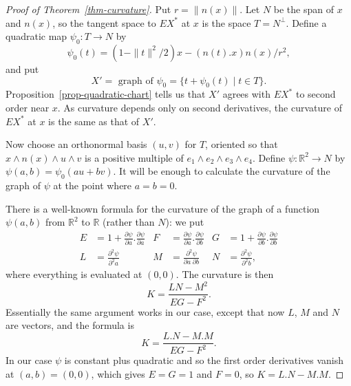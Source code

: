 \documentclass[reqno]{amsart}
\newcommand{\R}         {{\mathbb{R}}}
\newcommand{\st}        {\;|\;}
\renewcommand{\:}{\colon}
\theoremstyle{definition}
\begin{document}
\begin{proof}[Proof of Theorem~\ref{thm-curvature}]
 Put $r=\|n(x)\|$.  Let $N$ be the span of $x$ and $n(x)$, so the
 tangent space to $EX^*$ at $x$ is the space $T=N^\perp$.  Define a
 quadratic map $\psi_0\:T\to N$ by
 \[ \psi_0(t) = (1 - \|t\|^2/2)x - (n(t).x)n(x)/r^2, \]
 and put
 \[ X' = \text{ graph of } \psi_0 = \{t+\psi_0(t)\st t\in T\}. \]
 Proposition~\ref{prop-quadratic-chart} tells us that $X'$ agrees with
 $EX^*$ to second order near $x$.  As curvature depends only on second
 derivatives, the curvature of $EX^*$ at $x$ is the same as that of
 $X'$.

 Now choose an orthonormal basis $(u,v)$ for $T$, oriented so that
 $x\wedge n(x)\wedge u\wedge v$ is a positive multiple of
 $e_1\wedge e_2\wedge e_3\wedge e_4$.  Define $\psi\:\R^2\to N$ by
 $\psi(a,b)=\psi_0(au+bv)$.  It will be enough to calculate the
 curvature of the graph of $\psi$ at the point where $a=b=0$.

 There is a well-known formula for the curvature of the graph of a
 function $\psi(a,b)$ from $\R^2$ to $\R$ (rather than $N$): we put
 \begin{align*}
  E &= 1 + \frac{\partial \psi}{\partial a} . \frac{\partial \psi}{\partial a} &
  F &= \frac{\partial \psi}{\partial a} . \frac{\partial \psi}{\partial b} &
  G &= 1 + \frac{\partial \psi}{\partial b} . \frac{\partial \psi}{\partial b} \\
  L &= \frac{\partial^2\psi}{\partial^2 a} &
  M &= \frac{\partial^2\psi}{\partial a\;\partial b} &
  N &= \frac{\partial^2\psi}{\partial^2 b},
 \end{align*}
 where everything is evaluated at $(0,0)$.  The curvature is then
 \[ K = \frac{LN-M^2}{EG-F^2}. \]
 Essentially the same argument works in our case, except that now $L$,
 $M$ and $N$ are vectors, and the formula is
 \[ K = \frac{L.N-M.M}{EG-F^2}. \]
 In our case $\psi$ is constant plus quadratic and so the first order
 derivatives vanish at $(a,b)=(0,0)$, which gives $E=G=1$ and $F=0$,
 so $K=L.N-M.M$.


\end{proof}
\end{document}
